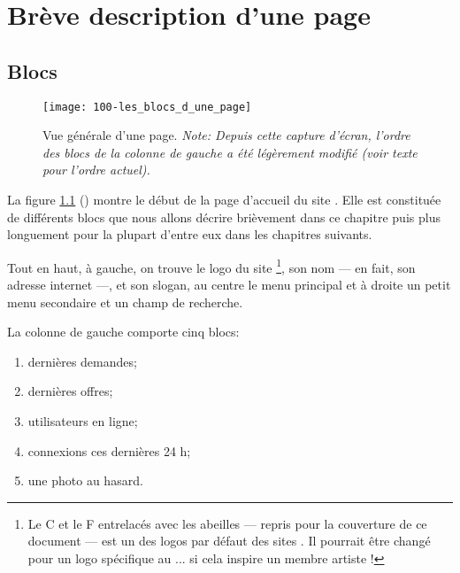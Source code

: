 \chapter{Brève description d'une page}\label{chap:descriptionPage}

\section{Blocs}

\begin{figure}
    \texttt{[image: 100-les\_blocs\_d\_une\_page]}
    \caption[Vue générale d’une page]{Vue générale d’une page. \textsl{\small Note: Depuis cette capture d'écran, l'ordre des blocs de la colonne de gauche a été légèrement modifié (voir texte pour l'ordre actuel).}}
    \label{fig:vueGeneralePage}
\end{figure}

La figure \ref{fig:vueGeneralePage} () montre le début de la page d'accueil du site \CF. Elle est constituée de différents blocs que nous allons décrire brièvement dans ce chapitre puis plus longuement pour la plupart d’entre eux dans les chapitres suivants.


Tout en haut, à gauche, on trouve le logo du site%
\footnote{Le C et le F entrelacés avec les abeilles --- repris pour la couverture de ce document --- est un des logos par défaut des sites \CF. Il pourrait être changé pour un logo spécifique au \CdS{} ... si cela inspire un membre artiste !},
son nom --- en fait, son adresse internet ---, et son slogan, au centre le menu principal et à droite un petit menu secondaire et un champ de recherche.


La colonne de gauche comporte cinq blocs: 
\begin{enumerate}
    \item dernières demandes;
    \item dernières offres;
    \item utilisateurs en ligne;
    \item connexions ces dernières 24 h;
    \item une photo au hasard.
\end{enumerate}

